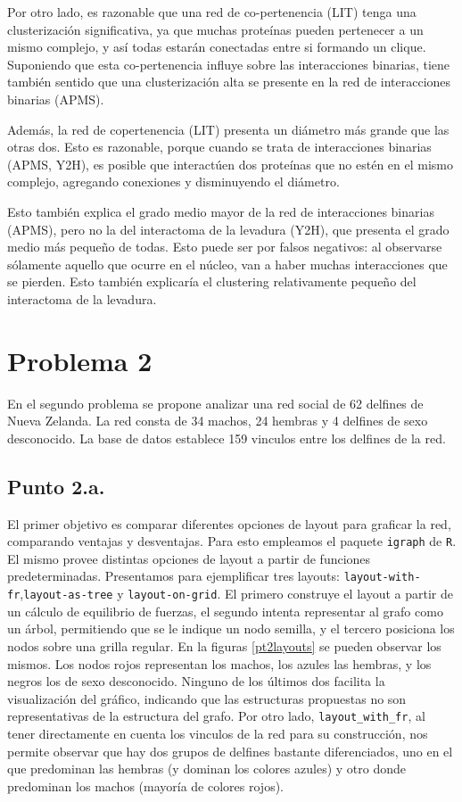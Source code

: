 \documentclass{article}
\begin{document}
Por otro lado, es razonable que una red de co-pertenencia (LIT) tenga una clusterización significativa, ya que muchas proteínas pueden pertenecer a un mismo complejo, y así todas estarán conectadas entre si formando un clique. Suponiendo que esta co-pertenencia influye sobre las interacciones binarias, tiene también sentido que una clusterización alta se presente en la red de interacciones binarias (APMS).

Además, la red de copertenencia (LIT) presenta un diámetro más grande que las otras dos. Esto es razonable, porque cuando se trata de interacciones binarias (APMS, Y2H), es posible que interactúen dos proteínas que no estén en el mismo complejo, agregando conexiones y disminuyendo el diámetro.

Esto también explica el grado medio mayor de la red de interacciones binarias (APMS), pero no la del interactoma de la levadura (Y2H), que presenta el grado medio más pequeño de todas. Esto puede ser por falsos negativos: al observarse sólamente aquello que ocurre en el núcleo, van a haber muchas interacciones que se pierden. Esto también explicaría el clustering relativamente pequeño del interactoma de la levadura.

\section{Problema 2}
En el segundo problema se propone analizar una red social de 62 delfines de Nueva Zelanda. La red consta de 34 machos, 24 hembras y 4 delfines de sexo desconocido. La base de datos establece 159 vinculos entre los delfines de la red.

\subsection{Punto 2.a.}
El primer objetivo es comparar diferentes opciones de layout para graficar la red, comparando ventajas y desventajas. Para esto empleamos el paquete \texttt{igraph} de \texttt{R}. El mismo provee distintas opciones de layout a partir de funciones predeterminadas. Presentamos para ejemplificar tres layouts: \texttt{layout-with-fr},\texttt{layout-as-tree} y \texttt{layout-on-grid}. El primero construye el layout a partir de un cálculo de equilibrio de fuerzas, el segundo intenta representar al grafo como un árbol, permitiendo que se le indique un nodo semilla, y el tercero posiciona los nodos sobre una grilla regular. En la figuras \ref{pt2layouts} se pueden observar los mismos. Los nodos rojos representan los machos, los azules las hembras, y los negros los de sexo desconocido. Ninguno de los últimos dos facilita la visualización del gráfico, indicando que las estructuras propuestas no son representativas de la estructura del grafo. Por otro lado, \texttt{layout\_with\_fr}, al tener directamente en cuenta los vinculos de la red para su construcción, nos permite observar que hay dos grupos de delfines bastante diferenciados, uno en el que predominan las hembras (y dominan los colores azules) y otro donde predominan los machos (mayoría de colores rojos).
\end{document}
